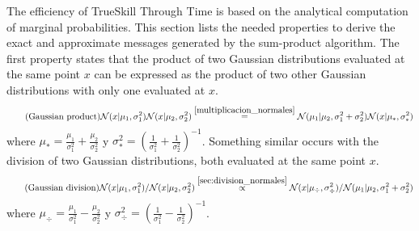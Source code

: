 \documentclass[article]{jss}
\newcommand{\N}{\mathcal{N}}
\begin{document}
The efficiency of TrueSkill Through Time is based on the analytical computation of marginal probabilities. 
This section lists the needed properties to derive the exact and approximate messages generated by the sum-product algorithm.  
The first property states that the product of two Gaussian distributions evaluated at the same point $x$ can be expressed as the product of two other Gaussian distributions with only one evaluated at $x$. 
%
\begin{equation*}\label{eq:gaussian_product} \tag{\text{Gaussian product}}
\N(x|\mu_1,\sigma_1^2)\N(x|\mu_2,\sigma_2^2) \overset{\ref{multiplicacion_normales}}{=} \N(\mu_1|\mu_2,\sigma_1^2+\sigma_2^2) \N(x|\mu_{*},\sigma_{*}^2)
\end{equation*}
%
where $\mu_{*} = \frac{\mu_1}{\sigma_1^2} + \frac{\mu_2}{\sigma_2^2}$ y $\sigma_{*}^2 = \left(\frac{1}{\sigma_1^2} + \frac{1}{\sigma_2^2} \right)^{-1}$.
Something similar occurs with the division of two Gaussian distributions, both evaluated at the same point $x$. 
%
\begin{equation*}\label{eq:gaussian_division} \tag{\text{Gaussian division}}
\N(x|\mu_1,\sigma_1^2)/\N(x|\mu_2,\sigma_2^2) \overset{\ref{sec:division_normales}}{\propto} \N(x|\mu_{\div},\sigma_{\div}^2)/\N(\mu_1|\mu_2,\sigma_1^2+\sigma_2^2) 
\end{equation*}
%
where $\mu_{\div} = \frac{\mu_1}{\sigma_1^2} - \frac{\mu_2}{\sigma_2^2}$ y $\sigma_{\div}^2 = \left(\frac{1}{\sigma_1^2} - \frac{1}{\sigma_2^2} \right)^{-1}$.

%
%
\end{document}
